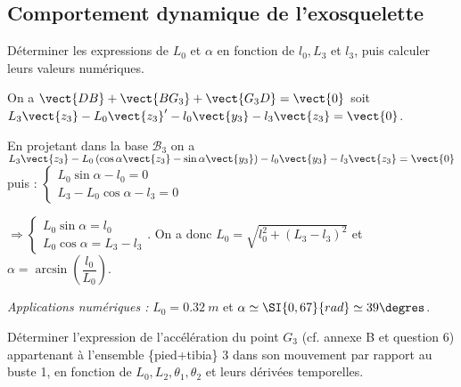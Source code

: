\documentclass[11pt]{article}
\begin{document}

\subsection{Comportement dynamique de l'exosquelette}


\UPSTIquestion Déterminer les expressions de $L_{0}$ et $\alpha$ en fonction de $l_{0}, L_{3}$ et $l_{3}$, puis calculer leurs valeurs numériques.

\begin{UPSTIcorrige}
On a $\vect{DB}+\vect{BG_3}+\vect{G_3D} = \vect{0}$ soit $L_3\vect{z_3}-L_0\vect{z_3}'-l_0\vect{y_3}-l_3\vect{z_3} = \vect{0}$. 

En projetant dans la base $\mathcal{B}_3$ on a 
$L_3\vect{z_3}-L_0\left(\cos\alpha \vect{z_3} - \sin\alpha \vect{y_3} \right)-l_0\vect{y_3}-l_3\vect{z_3} = \vect{0}$ puis : 
$
\left\{ \begin{array}{l}
L_0 \sin\alpha -l_0 = 0 \\
L_3-L_0 \cos\alpha -l_3 = 0
\end{array}
\right.
$

$
\Rightarrow 
\left\{ \begin{array}{l}
L_0 \sin\alpha = l_0  \\
L_0 \cos\alpha  = L_3 - l_3 
\end{array}
\right.
$.
On a donc $L_0 =\sqrt{l_0 ^2 + \left(L_3- l_3\right)^2}$ et $\alpha = \arcsin \left(\dfrac{l_0}{L_0}\right)$.

\textit{Applications numériques : } $L_0= \SI{0,32}{m}$ et $\alpha \simeq \SI{0,67}{rad} \simeq 39\degres$.

\end{UPSTIcorrige}

\UPSTIquestion Déterminer l'expression de l'accélération du point $G_{3}$ (cf. annexe B et question 6) appartenant à l'ensemble \{pied+tibia\} 3 dans son mouvement par rapport au buste 1, en fonction de $L_{0}, L_{2}, \theta_{1}, \theta_{2}$ et leurs dérivées temporelles.
\end{document}
